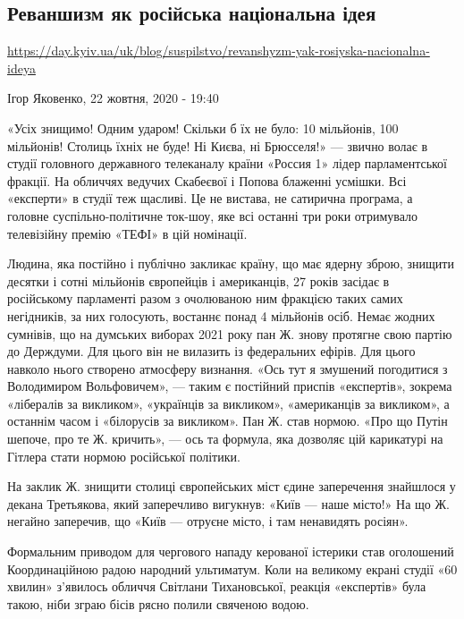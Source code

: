  
 

\subsection{Реваншизм як російська національна ідея}

\url{https://day.kyiv.ua/uk/blog/suspilstvo/revanshyzm-yak-rosiyska-nacionalna-ideya}

Ігор Яковенко, 22 жовтня, 2020 - 19:40

«Усіх знищимо!  Одним ударом!  Скільки б їх не було: 10 мільйонів, 100
мільйонів! Столиць їхніх не буде! Ні Києва, ні Брюсселя!» — звично волає в
студії головного державного телеканалу країни «Россия 1» лідер парламентської
фракції.  На обличчях ведучих Скабеєвої і Попова блаженні усмішки. Всі
«експерти» в студії теж щасливі.  Це не вистава, не сатирична програма, а
головне суспільно-політичне ток-шоу, яке всі останні три роки отримувало
телевізійну премію «ТЕФІ» в цій номінації.

Людина, яка постійно і публічно закликає країну, що має ядерну зброю, знищити
десятки і сотні мільйонів європейців і американців, 27 років засідає в
російському парламенті разом з очолюваною ним фракцією таких самих негідників,
за них голосують, востаннє понад 4 мільйонів осіб.  Немає жодних сумнівів, що
на думських виборах 2021 року пан Ж. знову протягне свою партію до Держдуми.
Для цього він не вилазить із федеральних ефірів. Для цього навколо нього
створено атмосферу визнання. «Ось тут я змушений погодитися з Володимиром
Вольфовичем», — таким є постійний приспів «експертів», зокрема «лібералів за
викликом», «українців за викликом», «американців за викликом», а останнім часом
і «білорусів за викликом». Пан Ж. став нормою. «Про що Путін шепоче, про те Ж.
кричить», — ось та формула, яка дозволяє цій карикатурі на Гітлера стати нормою
російської політики.

На заклик Ж. знищити столиці європейських міст єдине заперечення знайшлося у
декана Третьякова, який заперечливо вигукнув: «Київ — наше місто!» На що Ж.
негайно заперечив, що «Київ — отруєне місто, і там ненавидять росіян».

Формальним приводом для чергового нападу керованої істерики став оголошений
Координаційною радою народний ультиматум.  Коли на великому екрані студії «60
хвилин» з’явилось обличчя Світлани Тихановської, реакція «експертів» була
такою, ніби зграю бісів рясно полили свяченою водою.

